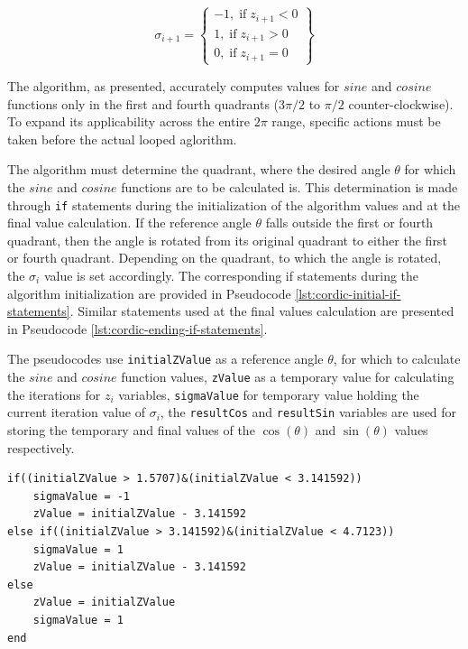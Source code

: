 \documentclass[a4paper, twoside, 11pt]{article}
\begin{document}
            \begin{equation}
                \sigma_{i+1} = 
                \left\{
                \begin{array}{lr}
                    -1,\;\text{if}\;z_{i+1} < 0\\
                    1,\;\text{if}\;z_{i+1} > 0\\
                    0,\;\text{if}\;z_{i+1} = 0
                \end{array}
                \right\}
            \end{equation}
            \par
            The algorithm, as presented, accurately computes values for $sine$ and $cosine$ functions only in the first and fourth quadrants ($3\pi/2$ to $\pi/2$ counter-clockwise). To expand its applicability across the entire $2\pi$ range, specific actions must be taken before the actual looped aglorithm.\par
            The algorithm must determine the quadrant, where the desired angle $\theta$ for which the $sine$ and $cosine$ functions are to be calculated is. This determination is made through \texttt{if} statements during the initialization of the algorithm values and at the final value calculation. If the reference angle $\theta$ falls outside the first or fourth quadrant, then the angle is rotated from its original quadrant to either the first or fourth quadrant. Depending on the quadrant, to which the angle is rotated, the $\sigma_i$ value is set accordingly. The corresponding if statements during the algorithm initialization are provided in Pseudocode \ref{lst:cordic-initial-if-statements}. Similar statements used at the final values calculation are presented in Pseudocode \ref{lst:cordic-ending-if-statements}.\par
            The pseudocodes use \texttt{initialZValue} as a reference angle $\theta$, for which to calculate the $sine$ and $cosine$ function values, \texttt{zValue} as a temporary value for calculating the iterations for $z_{i}$ variables, \texttt{sigmaValue} for temporary value holding the current iteration value of $\sigma_i$, the \texttt{resultCos} and \texttt{resultSin} variables are used for storing the temporary and final values of the $\cos (\theta)$ and $\sin (\theta)$ values respectively.

\begin{lstlisting}[language={pseudocode}, caption={Pseudocode for if statements used at the value initialization of the \gls{abbreviation:cordic} algorithm.}, label= {lst:cordic-initial-if-statements}]
if((initialZValue > 1.5707)&(initialZValue < 3.141592))
    sigmaValue = -1
    zValue = initialZValue - 3.141592
else if((initialZValue > 3.141592)&(initialZValue < 4.7123))
    sigmaValue = 1
    zValue = initialZValue - 3.141592
else
    zValue = initialZValue
    sigmaValue = 1
end
\end{lstlisting}
\end{document}
